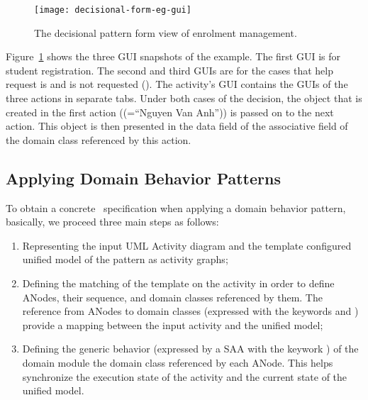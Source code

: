 {\begin{figure}[ht]
	\begin{center}
		\texttt{[image: decisional-form-eg-gui]}
	\end{center}
	\vspace{-0.5cm}
	\caption{The decisional pattern form view of enrolment management.} %
	\label{fig:decisional-form-eg-gui}
\end{figure}

\noindent Figure~\ref{fig:decisional-form-eg-gui} shows the three GUI snapshots of the example. The first GUI is for student registration. The second and third GUIs are for the cases that help request is and is not requested (\resp). The activity's GUI contains the GUIs of the three actions in separate tabs. Under both cases of the decision, the  object that is created in the first action (\eg {}(=``Nguyen Van Anh'')) is passed on to the next action. This object is then presented in the data field of the associative field  of the domain class referenced by this action.

\subsection{Applying Domain Behavior Patterns}

To obtain a concrete \agl~specification when applying a domain behavior pattern, basically, we proceed three main steps as follows:
\begin{enumerate}
	\item Representing the input UML Activity diagram and the template configured unified model of the pattern as activity graphs; 
	\item Defining the matching of the template on the activity in order to define ANodes, their sequence, and domain classes referenced by them. The reference from ANodes to domain classes (expressed with the keywords  and ) provide a mapping between the input activity and the unified model; 
	\item Defining the generic behavior (expressed by a SAA with the keywork ) of the domain module \wrt the domain class referenced by each ANode. This helps synchronize the execution state of the activity and the current state of the unified model.
\end{enumerate} 

}
